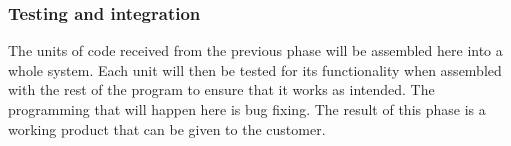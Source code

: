\subsubsection{Testing and integration}

The units of code received from the previous phase will be assembled here into a whole 
system. Each unit will then be tested for its functionality when assembled with the rest of 
the program to ensure that it works as intended\cite{waterfallexplained}. The programming 
that will happen here is bug fixing\cite{waterfallexplained}. The result of this phase is a 
working product that can be given to the customer\cite{waterfallexplained}.